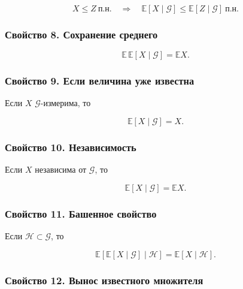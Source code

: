 \documentclass[
  11pt,
  a4paper,
]{article}
\begin{document}
\[
X\le Z\ \text{п.н.}
\quad\Rightarrow\quad
\mathbb E[X\mid\mathcal G]\le \mathbb E[Z\mid\mathcal G]\ \text{п.н.}
\]

\subsubsection{Свойство 8. Сохранение
среднего}\label{ux441ux432ux43eux439ux441ux442ux432ux43e-8.-ux441ux43eux445ux440ux430ux43dux435ux43dux438ux435-ux441ux440ux435ux434ux43dux435ux433ux43e}

\[
\mathbb E\,\mathbb E[X\mid\mathcal G]=\mathbb EX.
\]

\subsubsection{Свойство 9. Если величина уже
известна}\label{ux441ux432ux43eux439ux441ux442ux432ux43e-9.-ux435ux441ux43bux438-ux432ux435ux43bux438ux447ux438ux43dux430-ux443ux436ux435-ux438ux437ux432ux435ux441ux442ux43dux430}

Если \(X\) \(\mathcal G\)-измерима, то

\[
\mathbb E[X\mid\mathcal G]=X.
\]

\subsubsection{Свойство 10.
Независимость}\label{ux441ux432ux43eux439ux441ux442ux432ux43e-10.-ux43dux435ux437ux430ux432ux438ux441ux438ux43cux43eux441ux442ux44c}

Если \(X\) независима от \(\mathcal G\), то

\[
\mathbb E[X\mid\mathcal G]=\mathbb EX.
\]

\subsubsection{Свойство 11. Башенное
свойство}\label{ux441ux432ux43eux439ux441ux442ux432ux43e-11.-ux431ux430ux448ux435ux43dux43dux43eux435-ux441ux432ux43eux439ux441ux442ux432ux43e}

Если \(\mathcal H\subset\mathcal G\), то

\[
\mathbb E[\mathbb E[X\mid\mathcal G]\mid\mathcal H]
=
\mathbb E[X\mid\mathcal H].
\]

\subsubsection{Свойство 12. Вынос известного
множителя}\label{ux441ux432ux43eux439ux441ux442ux432ux43e-12.-ux432ux44bux43dux43eux441-ux438ux437ux432ux435ux441ux442ux43dux43eux433ux43e-ux43cux43dux43eux436ux438ux442ux435ux43bux44f}
\end{document}
